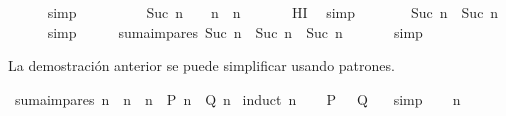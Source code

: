 \begin{isabellebody}
\ \ \ \ \isamarkupfalse%
\ simp\isanewline
\ \ \isamarkupfalse%
\ \isamarkupfalse%
\ {\isachardoublequoteopen}{\isasymdots}\ {\isacharequal}\ {\isacharparenleft}{}\ {\isacharasterisk}\ {\isacharparenleft}Suc\ n{\isacharparenright}\ {\isacharminus}\ {}{\isacharparenright}\ {\isacharplus}\ n\ {\isacharasterisk}\ n{\isachardoublequoteclose}\ \isanewline
\ \ \ \ \isamarkupfalse%
\ HI\ \isamarkupfalse%
\ simp\isanewline
\ \ \isamarkupfalse%
\ \isamarkupfalse%
\ {\isachardoublequoteopen}{\isasymdots}\ {\isacharequal}\ {\isacharparenleft}Suc\ n{\isacharparenright}\ {\isacharasterisk}\ {\isacharparenleft}Suc\ n{\isacharparenright}{\isachardoublequoteclose}\ \isanewline
\ \ \ \ \isamarkupfalse%
\ simp\isanewline
\ \ \isamarkupfalse%
\ \isamarkupfalse%
\ {\isachardoublequoteopen}suma{\isacharunderscore}impares\ {\isacharparenleft}Suc\ n{\isacharparenright}\ {\isacharequal}\ {\isacharparenleft}Suc\ n{\isacharparenright}\ {\isacharasterisk}\ {\isacharparenleft}Suc\ n{\isacharparenright}{\isachardoublequoteclose}\ \isanewline
\ \ \ \ \isamarkupfalse%
\ simp\isanewline
{}\isamarkupfalse%
%
\endisatagproof
{\isafoldproof}%
%
\isadelimproof
%
\endisadelimproof
%
\isadelimdocument
%
\endisadelimdocument
%
\isatagdocument
%
\isamarkuptrue%
%
\endisatagdocument
{\isafolddocument}%
%
\isadelimdocument
%
\endisadelimdocument
%
\begin{isamarkuptext}%
La demostración anterior se puede simplificar usando patrones.%
\end{isamarkuptext}\isamarkuptrue%
\isamarkupfalse%
\ {\isachardoublequoteopen}suma{\isacharunderscore}impares\ n\ {\isacharequal}\ n\ {\isacharasterisk}\ n{\isachardoublequoteclose}\ {\isacharparenleft}\ {\isachardoublequoteopen}{\isacharquery}P\ n\ {\isacharequal}\ {\isacharquery}Q\ n{\isachardoublequoteclose}{\isacharparenright}\isanewline
%
\isadelimproof
%
\endisadelimproof
%
\isatagproof
{}\isamarkupfalse%
\ {\isacharparenleft}induct\ n{\isacharparenright}\isanewline
\ \ \isamarkupfalse%
\ {\isachardoublequoteopen}{\isacharquery}P\ {}\ {\isacharequal}\ {\isacharquery}Q\ {}{\isachardoublequoteclose}\ \isamarkupfalse%
\ simp\isanewline
{}\isamarkupfalse%
\isanewline
\ \ \isamarkupfalse%
\ n\ \isanewline

\end{isabellebody}
